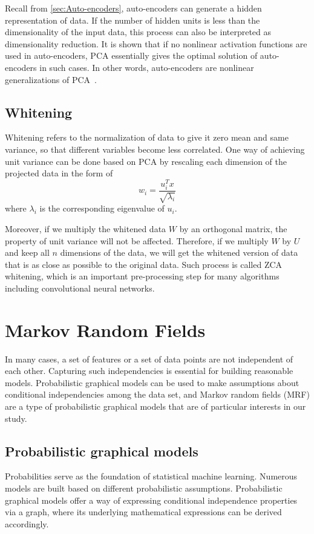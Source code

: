 Recall from \ref{sec:Auto-encoders}, auto-encoders can generate a hidden representation of data. If the number of hidden units is less than the dimensionality of the input data, this process can also be interpreted as  
dimensionality reduction. It is shown that if no nonlinear activation functions are used in auto-encoders, PCA essentially gives the optimal solution of auto-encoders in such cases. In other words, auto-encoders are nonlinear generalizations of PCA~\cite{hinton2006reducing}.

\subsection{Whitening}
\label{Whitening}
Whitening refers to the normalization of data to give it zero mean and same variance, so that different variables become less correlated. One way of achieving unit variance can be done based on PCA by rescaling each dimension of the projected data in the form of
\begin{equation}
\label{pcaeq2}
	w_i = \frac{u_i^Tx}{\sqrt{\lambda_i}}
\end{equation}
where $\lambda_i$ is the corresponding eigenvalue of $u_i$.

Moreover, if we multiply the whitened data $W$ by an orthogonal matrix, the property of unit variance will not be affected. Therefore, if we multiply $W$ by $U$ and keep all $n$ dimensions of the data, we will get the whitened version of data that is  as close as possible to the original data. Such process is called ZCA whitening, which is an important pre-processing step for many algorithms including convolutional neural networks.

\section{Markov Random Fields}
\label{sec:Markov Random Fields}
In many cases, a set of features or a set of data points are not independent of each other. Capturing such independencies is essential for building reasonable models. Probabilistic graphical models can be used to make assumptions about conditional independencies among the data set, and Markov random fields (MRF) are a type of probabilistic graphical models that are of particular interests in our study.

\subsection{Probabilistic graphical models}
\label{sec:Probabilistic graphical models}
Probabilities serve as the foundation of statistical machine learning. Numerous models are built based on different probabilistic assumptions. Probabilistic graphical models offer a way of expressing conditional independence properties via a graph, where its underlying mathematical expressions can be derived accordingly.

